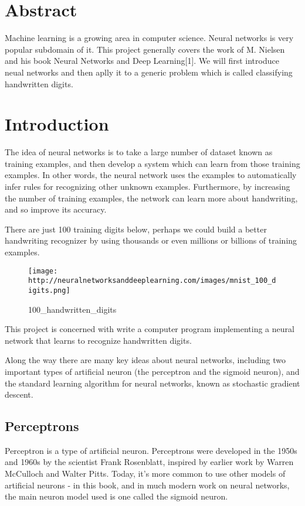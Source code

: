 \documentclass[]{article}
\begin{document}
\section{Abstract}\label{abstract}

Machine learning is a growing area in computer science. Neural networks
is very popular subdomain of it. This project generally covers the work
of M. Nielsen and his book Neural Networks and Deep Learning{[}1{]}. We
will first introduce neual networks and then aplly it to a generic
problem which is called classifying handwritten digits.

\section{Introduction}\label{introduction}

The idea of neural networks is to take a large number of dataset known
as training examples, and then develop a system which can learn from
those training examples. In other words, the neural network uses the
examples to automatically infer rules for recognizing other unknown
examples. Furthermore, by increasing the number of training examples,
the network can learn more about handwriting, and so improve its
accuracy.

There are just 100 training digits below, perhaps we could build a
better handwriting recognizer by using thousands or even millions or
billions of training examples.

\begin{figure}[htbp]
\centering
\texttt{[image: http://neuralnetworksanddeeplearning.com/images/mnist\_100\_digits.png]}
\caption{100\_handwritten\_digits}
\end{figure}

This project is concerned with write a computer program implementing a
neural network that learns to recognize handwritten digits.

Along the way there are many key ideas about neural networks, including
two important types of artificial neuron (the perceptron and the sigmoid
neuron), and the standard learning algorithm for neural networks, known
as stochastic gradient descent.

\subsection{Perceptrons}\label{perceptrons}

Perceptron is a type of artificial neuron. Perceptrons were developed in
the 1950s and 1960s by the scientist Frank Rosenblatt, inspired by
earlier work by Warren McCulloch and Walter Pitts. Today, it's more
common to use other models of artificial neurons - in this book, and in
much modern work on neural networks, the main neuron model used is one
called the sigmoid neuron.
\end{document}
